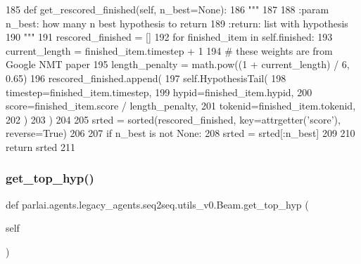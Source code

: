 \begin{DoxyCode}
185     \textcolor{keyword}{def }get\_rescored\_finished(self, n\_best=None):
186         \textcolor{stringliteral}{"""}
187 \textcolor{stringliteral}{}
188 \textcolor{stringliteral}{        :param n\_best: how many n best hypothesis to return}
189 \textcolor{stringliteral}{        :return: list with hypothesis}
190 \textcolor{stringliteral}{        """}
191         rescored\_finished = []
192         \textcolor{keywordflow}{for} finished\_item \textcolor{keywordflow}{in} self.finished:
193             current\_length = finished\_item.timestep + 1
194             \textcolor{comment}{# these weights are from Google NMT paper}
195             length\_penalty = math.pow((1 + current\_length) / 6, 0.65)
196             rescored\_finished.append(
197                 self.HypothesisTail(
198                     timestep=finished\_item.timestep,
199                     hypid=finished\_item.hypid,
200                     score=finished\_item.score / length\_penalty,
201                     tokenid=finished\_item.tokenid,
202                 )
203             )
204 
205         srted = sorted(rescored\_finished, key=attrgetter(\textcolor{stringliteral}{'score'}), reverse=\textcolor{keyword}{True})
206 
207         \textcolor{keywordflow}{if} n\_best \textcolor{keywordflow}{is} \textcolor{keywordflow}{not} \textcolor{keywordtype}{None}:
208             srted = srted[:n\_best]
209 
210         \textcolor{keywordflow}{return} srted
211 
\end{DoxyCode}
\mbox{\label{classparlai_1_1agents_1_1legacy__agents_1_1seq2seq_1_1utils__v0_1_1Beam_abbb522afdc69dbce77f997dd392c5c1d}} 
\subsubsection{\texorpdfstring{get\+\_\+top\+\_\+hyp()}{get\_top\_hyp()}}
{\footnotesize\ttfamily def parlai.\+agents.\+legacy\+\_\+agents.\+seq2seq.\+utils\+\_\+v0.\+Beam.\+get\+\_\+top\+\_\+hyp (\begin{DoxyParamCaption}\item[{}]{self }\end{DoxyParamCaption})}

